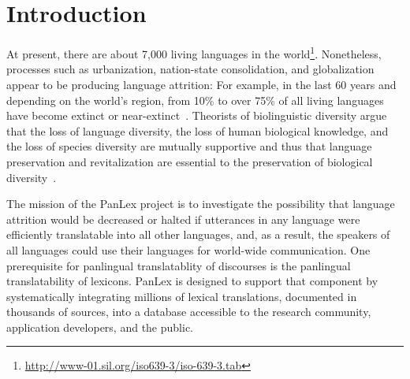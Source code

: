 \documentclass[sw]{iosart2c}
\begin{document}
\section{Introduction}
\label{sec:intro}
At present, there are about 7,000 living languages in the world\footnote{\url{http://www-01.sil.org/iso639-3/iso-639-3.tab}}.
Nonetheless, processes such as urbanization, nation-state consolidation, and globalization appear to be producing language attrition: For example, in the last 60 years and depending on the world's region, from 10\% to over 75\% of all living languages have become extinct or near-extinct~\cite{lang_crisis}.
Theorists of biolinguistic diversity argue that the loss of language diversity, the loss of human biological knowledge, and the loss of species diversity are mutually supportive and thus that language preservation and revitalization are essential to the preservation of biological diversity~\cite{nettle}.

The mission of the PanLex project is to investigate the possibility that language attrition would be decreased or halted if utterances in any language were efficiently translatable into all other languages, and, as a result, the speakers of all languages could use their languages for world-wide communication.
One prerequisite for panlingual translatablity of discourses is the panlingual translatability of lexicons.
PanLex is designed to support that component by systematically integrating millions of lexical translations, documented in thousands of sources, into a database accessible to the research community, application developers, and the public.
\end{document}
